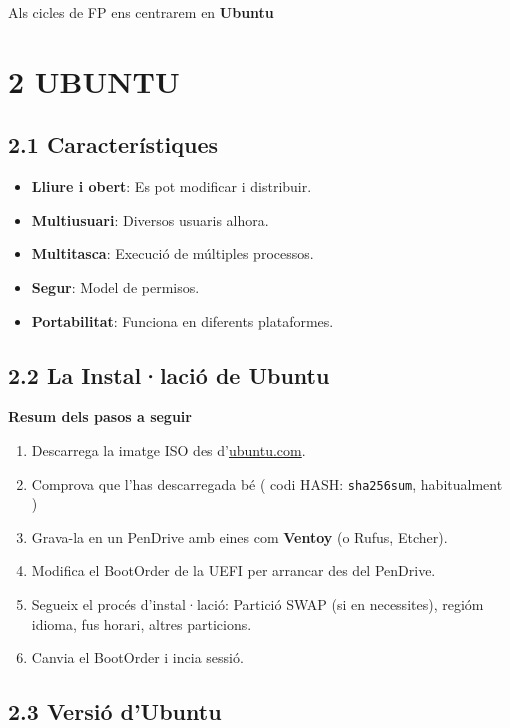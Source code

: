 \documentclass[
  a4paper,
]{article}
\providecommand{\tightlist}{%
  \setlength{\itemsep}{0pt}\setlength{\parskip}{0pt}}
\begin{document}
Als cicles de FP ens centrarem en \textbf{Ubuntu}

\section{2 UBUNTU}\label{ubuntu}

\subsection{2.1 Característiques}\label{caracteruxedstiques-1}

\begin{itemize}
\tightlist
\item
  \textbf{Lliure i obert}: Es pot modificar i distribuir.
\item
  \textbf{Multiusuari}: Diversos usuaris alhora.
\item
  \textbf{Multitasca}: Execució de múltiples processos.
\item
  \textbf{Segur}: Model de permisos.
\item
  \textbf{Portabilitat}: Funciona en diferents plataformes.
\end{itemize}

\subsection{2.2 La Instal·lació de
Ubuntu}\label{la-installaciuxf3-de-ubuntu}

\textbf{Resum dels pasos a seguir}

\begin{enumerate}
\def\labelenumi{\arabic{enumi}.}
\tightlist
\item
  Descarrega la imatge ISO des d'\href{https://ubuntu.com/}{ubuntu.com}.
\item
  Comprova que l'has descarregada bé ( codi HASH: \texttt{sha256sum},
  habitualment )
\item
  Grava-la en un PenDrive amb eines com \textbf{Ventoy} (o Rufus,
  Etcher).
\item
  Modifica el BootOrder de la UEFI per arrancar des del PenDrive.
\item
  Segueix el procés d'instal·lació: Partició SWAP (si en necessites),
  regióm idioma, fus horari, altres particions.
\item
  Canvia el BootOrder i incia sessió.
\end{enumerate}

\subsection{2.3 Versió d'Ubuntu}\label{versiuxf3-dubuntu}
\end{document}

